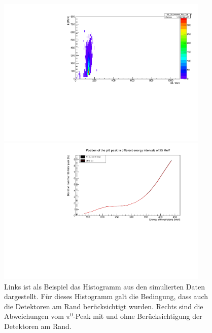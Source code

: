 \documentclass[a4paper,11pt,oneside,final,german,openbib,pdftex]{scrbook}
\begin{document}
{\begin{figure}[h!]
	\centering
	\begin{minipage}{0.45\textwidth}
		\centering
		\includegraphics[width=0.9\textwidth]{20171104HistPi0Gun}
	\end{minipage}
	\hfill
	\begin{minipage}{0.45\textwidth}
		\centering
		\includegraphics[width=0.9\textwidth]{20171104MitOhneCutLongTargetBeamDeviation}
	\end{minipage}
\caption{Links ist als Beispiel das Histogramm aus den simulierten Daten dargestellt. Für dieses Histogramm galt die Bedingung, dass auch die Detektoren am Rand berücksichtigt wurden. Rechts sind die Abweichungen vom $\pi^0$-Peak mit und ohne Berücksichtigung der Detektoren am Rand.}
\label{fig:Simulierte-Daten-Abweichung}
\end{figure}

}
\end{document}
